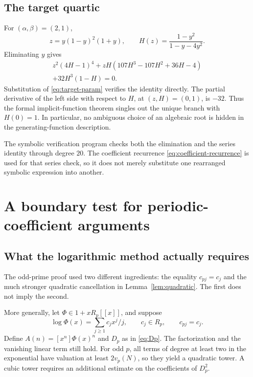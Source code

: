 \documentclass[11pt,a4paper]{article}
\numberwithin{equation}{section}
\theoremstyle{definition}
\theoremstyle{remark}
\begin{document}
\subsection{The target quartic}
For $(\alpha,\beta)=(2,1)$,
\begin{equation}\label{eq:target-param}
 z=y(1-y)^2(1+y),\qquad
 H(z)=\frac{1-y^2}{1-y-4y^2}.
\end{equation}
Eliminating $y$ gives
\begin{equation}\label{eq:quartic}
 \begin{split}
 z^2(4H-1)^4
 +zH(107H^3-107H^2+36H-4)\\
 +32H^3(1-H)=0.
 \end{split}
\end{equation}
Substitution of \eqref{eq:target-param} verifies the identity directly.
The partial derivative of the left side with respect to $H$, at
$(z,H)=(0,1)$, is $-32$. Thus the formal implicit-function theorem singles
out the unique branch with $H(0)=1$. In particular, no ambiguous choice of
an algebraic root is hidden in the generating-function description.

The symbolic verification program checks both the elimination and the
series identity through degree $20$. The coefficient recurrence
\eqref{eq:coefficient-recurrence} is used for that series check, so it does
not merely substitute one rearranged symbolic expression into another.

\section{A boundary test for periodic-coefficient arguments}
\label{sec:boundary}

\subsection{What the logarithmic method actually requires}
The odd-prime proof used two different ingredients: the equality $c_{pj}=c_j$
and the much stronger quadratic cancellation in Lemma~\ref{lem:quadratic}.
The first does not imply the second.

More generally, let $\Phi\in1+xR_p[[x]]$, and suppose
\[
 \log\Phi(x)=\sum_{j\ge1}c_jx^j/j,\qquad c_j\in R_p,\qquad c_{pj}=c_j.
\]
Define $A(n)=[x^n]\Phi(x)^n$ and $D_p$ as in \eqref{eq:Dp}. The
factorization and the vanishing linear term still hold. For odd $p$, all
terms of degree at least two in the exponential have valuation at least
$2v_p(N)$, so they yield a quadratic tower. A cubic tower requires an
additional estimate on the coefficients of $D_p^2$.
\end{document}

